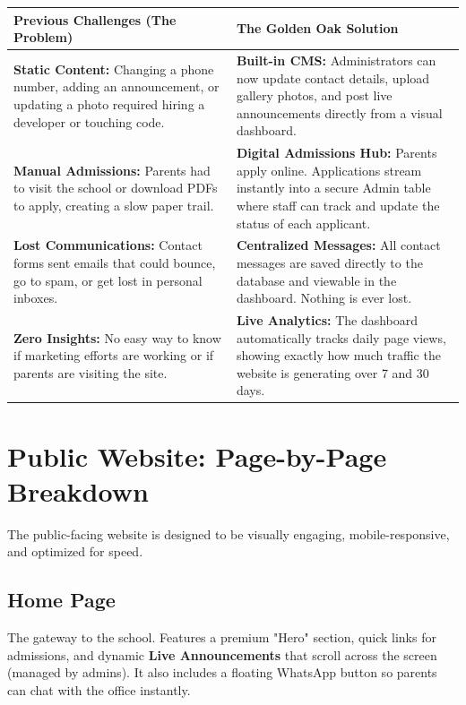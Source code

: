 \documentclass[11pt,a4paper]{article}
\begin{document}
\vspace{1em}
\noindent
\begin{tabularx}{\textwidth}{@{} >{\raggedright\arraybackslash}p{} >{\raggedright\arraybackslash}X @{}}
\toprule
\textbf{Previous Challenges (The Problem)} & \textbf{The Golden Oak Solution} \\
\midrule
\textbf{Static Content:} Changing a phone number, adding an announcement, or updating a photo required hiring a developer or touching code. & \textbf{Built-in CMS:} Administrators can now update contact details, upload gallery photos, and post live announcements directly from a visual dashboard. \\
\addlinespace
\textbf{Manual Admissions:} Parents had to visit the school or download PDFs to apply, creating a slow paper trail. & \textbf{Digital Admissions Hub:} Parents apply online. Applications stream instantly into a secure Admin table where staff can track and update the status of each applicant. \\
\addlinespace
\textbf{Lost Communications:} Contact forms sent emails that could bounce, go to spam, or get lost in personal inboxes. & \textbf{Centralized Messages:} All contact messages are saved directly to the database and viewable in the dashboard. Nothing is ever lost. \\
\addlinespace
\textbf{Zero Insights:} No easy way to know if marketing efforts are working or if parents are visiting the site. & \textbf{Live Analytics:} The dashboard automatically tracks daily page views, showing exactly how much traffic the website is generating over 7 and 30 days. \\
\bottomrule
\end{tabularx}
\vspace{1em}

\section{Public Website: Page-by-Page Breakdown}

The public-facing website is designed to be visually engaging, mobile-responsive, and optimized for speed.

\subsection{Home Page}
The gateway to the school. Features a premium "Hero" section, quick links for admissions, and dynamic \textbf{Live Announcements} that scroll across the screen (managed by admins). It also includes a floating WhatsApp button so parents can chat with the office instantly.
\end{document}
